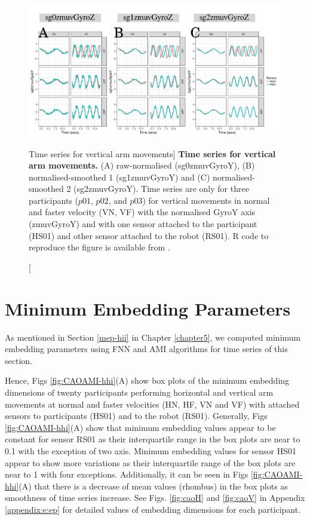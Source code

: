 \begin{figure}[!h]
  \centering
\includegraphics[width=1.0\textwidth]{fig_6_02}
	\caption
	[Time series for vertical arm movements]{
	{\bf Time series for vertical arm movements.}
		(A) raw-normalised (sg0zmuvGyroY), 
		(B) normalised-smoothed 1 (sg1zmuvGyroY) and
		(C) normalised-smoothed 2 (sg2zmuvGyroY).
		Time series are only for three participants 
		($p01$, $p02$, and $p03$) 
		for vertical movements in normal and faster velocity (VN, VF) 
		with the normalised GyroY axis (zmuvGyroY) 
		and with one sensor attached to the participant (HS01) 
		and other sensor attached to the robot (RS01).
		R code to reproduce the figure is available 
		from \cite{xochicale2018}.
        }
    \label{fig:tsV}
\end{figure}

\section{Minimum Embedding Parameters}
As mentioned in Section \ref{mep-hii} in Chapter \ref{chapter5}, 
we computed minimum embedding parameters using FNN and AMI algorithms
for time series of this section.

Hence, Figs \ref{fig:CAOAMI-hhi}(A) show box plots of the minimum embedding 
dimensions of twenty participants performing horizontal and vertical arm
movements at normal and faster velocities (HN, HF, VN and VF) with 
attached sensors to participants (HS01) and to the robot (RS01).
Generally, Figs \ref{fig:CAOAMI-hhi}(A) show that minimum embedding values 
appear to be constant for sensor RS01 as their interquartile range 
in the box plots are near to 0.1 with the exception of two axis. 
Minimum embedding values for sensor HS01 appear to show more variations 
as their interquartile range of the box plots are near to 1 
with four exceptions.
Additionally, it can be seen in Figs \ref{fig:CAOAMI-hhi}(A) that there is a 
decrease of mean values (rhombus) in the box plots
as smoothness of time series increase. 
See Figs. \ref{fig:caoH} and \ref{fig:caoV} in Appendix \ref{appendix:e:ep} 
for detailed values of embedding dimensions for each participant.

